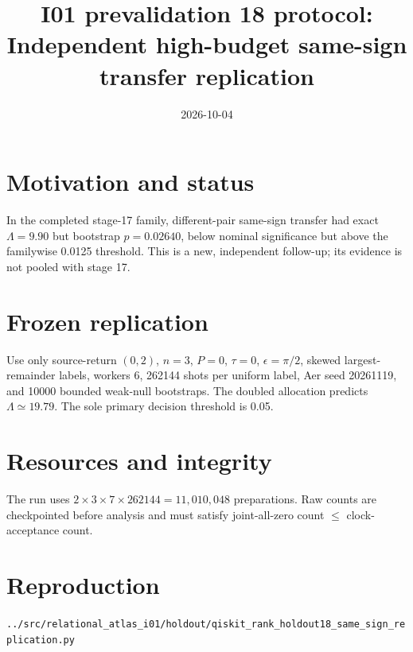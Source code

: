 \documentclass[11pt]{article}
\begin{document}
\title{I01 prevalidation 18 protocol:\\Independent high-budget same-sign transfer replication}
\date{2026-10-04}
\maketitle

\section*{Motivation and status}
In the completed stage-17 family, different-pair same-sign transfer had exact
$\Lambda=9.90$ but bootstrap $p=0.02640$, below nominal significance but above the
familywise 0.0125 threshold. This is a new, independent follow-up; its evidence is
not pooled with stage 17.

\section*{Frozen replication}
Use only source-return $(0,2)$, $n=3$, $P=0$, $\tau=0$, $\epsilon=\pi/2$, skewed
largest-remainder labels, workers 6, 262144 shots per uniform label, Aer seed
20261119, and 10000 bounded weak-null bootstraps. The doubled allocation predicts
$\Lambda\simeq19.79$. The sole primary decision threshold is 0.05.

\section*{Resources and integrity}
The run uses $2\times3\times7\times262144=11{,}010{,}048$ preparations. Raw counts
are checkpointed before analysis and must satisfy joint-all-zero count
$\leq$ clock-acceptance count.

\section*{Reproduction}
\texttt{../src/relational\_atlas\_i01/holdout/qiskit\_rank\_holdout18\_same\_sign\_replication.py}
\end{document}
